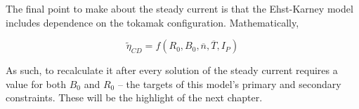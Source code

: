 The final point to make about the steady current is that the Ehst-Karney model includes dependence on the tokamak configuration. Mathematically,

\begin{equation}
	\tilde \eta_{CD} = f( R_0, B_0, \overline n, \overline T, I_P )
\end{equation}

As such, to recalculate it after every solution of the steady current requires a value for both $B_0$ and $R_0$ -- the targets of this model's primary and secondary constraints. These will be the highlight of the next chapter.

%
